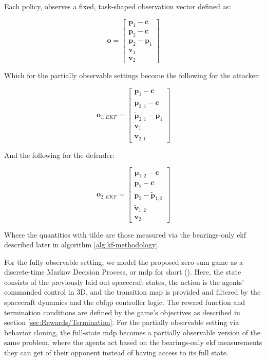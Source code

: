 Each policy, observes a fixed, task-shaped observation vector defined as:

\begin{equation}
\label{eq:Full_Obs_Both_Agents}
\boxed{
\mathbf{o} =
\begin{bmatrix}
\mathbf{p}_1-\mathbf{c}\\
\mathbf{p}_2-\mathbf{c}\\
\mathbf{p}_2-\mathbf{p}_1\\
\mathbf{v}_1\\
\mathbf{v}_2
\end{bmatrix}
}
\end{equation}



Which for the partially observable settings become the following for the attacker:

\begin{equation}
\label{eq:EKF_Obs_Agent_1}
\boxed{
\mathbf{o}_{1,EKF} =
\begin{bmatrix}
\mathbf{p}_1-\mathbf{c}\\
\tilde{\mathbf{p}}_{2,1}-\mathbf{c}\\
\tilde{\mathbf{p}}_{2,1}-\mathbf{p}_1\\
\mathbf{v}_1\\
\tilde{\mathbf{v}}_{2,1}
\end{bmatrix}
}
\end{equation}

And the following for the defender:

\begin{equation}
\label{eq:EKF_Obs_Agent_2}
\boxed{
\mathbf{o}_{2,EKF} =
\begin{bmatrix}
\tilde{\mathbf{p}}_{1,2}-\mathbf{c}\\
\mathbf{p}_2-\mathbf{c}\\
\mathbf{p}_2-\tilde{\mathbf{p}}_{1,2}\\
\tilde{\mathbf{v}}_{1,2}\\
\mathbf{v}_2
\end{bmatrix}
}
\end{equation}

Where the quantities with tilde are those measured  via the bearings-only \acs{ekf} described later in algorithm \ref{alg:kf-methodology}. 

For the fully observable setting, we model the proposed zero-sum game as a discrete-time Markov Decision Process, or \acs{mdp} for short (\cite{Howard1960DynamicProgramming}). Here, the state consists of the previously laid out spacecraft states, the action is the agents' commanded control in 3D, and the transition map is provided and filtered by the spacecraft dynamics and the \acs{cbfqp} controller logic. The reward function and termination conditions are defined by the game's objectives as described in section \ref{sec:Rewards/Termination}. For the partially observable setting via behavior cloning, the full-state \acs{mdp} becomes a partially observable version of the same problem, where the agents act based on the bearings-only \acs{ekf} measurements they can get of their opponent instead of having access to its full state.


